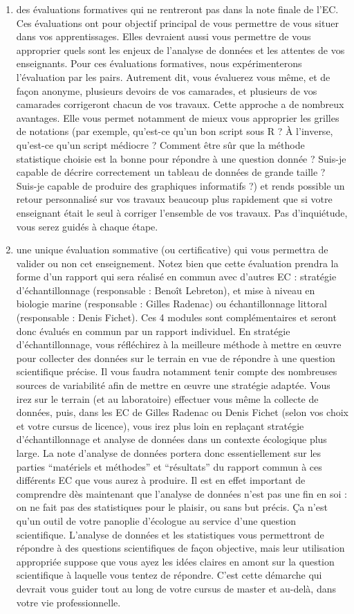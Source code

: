 \documentclass[a4paperpaper,]{article}
\begin{document}
\begin{enumerate}
\def\labelenumi{\arabic{enumi}.}
\item
  des évaluations formatives qui ne rentreront pas dans la note finale de l'EC. Ces évaluations ont pour objectif principal de vous permettre de vous situer dans vos apprentissages. Elles devraient aussi vous permettre de vous approprier quels sont les enjeux de l'analyse de données et les attentes de vos enseignants. Pour ces évaluations formatives, nous expérimenterons l'évaluation par les pairs. Autrement dit, vous évaluerez vous même, et de façon anonyme, plusieurs devoirs de vos camarades, et plusieurs de vos camarades corrigeront chacun de vos travaux. Cette approche a de nombreux avantages. Elle vous permet notamment de mieux vous approprier les grilles de notations (par exemple, qu'est-ce qu'un bon script sous R ? À l'inverse, qu'est-ce qu'un script médiocre ? Comment être sûr que la méthode statistique choisie est la bonne pour répondre à une question donnée ? Suis-je capable de décrire correctement un tableau de données de grande taille ? Suis-je capable de produire des graphiques informatifs ?) et rends possible un retour personnalisé sur vos travaux beaucoup plus rapidement que si votre enseignant était le seul à corriger l'ensemble de vos travaux. Pas d'inquiétude, vous serez guidés à chaque étape.
\item
  une unique évaluation sommative (ou certificative) qui vous permettra de valider ou non cet enseignement. Notez bien que cette évaluation prendra la forme d'un rapport qui sera réalisé en commun avec d'autres EC : stratégie d'échantillonnage (responsable : Benoît Lebreton), et mise à niveau en biologie marine (responsable : Gilles Radenac) ou échantillonnage littoral (responsable : Denis Fichet). Ces 4 modules sont complémentaires et seront donc évalués en commun par un rapport individuel. En stratégie d'échantillonnage, vous réfléchirez à la meilleure méthode à mettre en œuvre pour collecter des données sur le terrain en vue de répondre à une question scientifique précise. Il vous faudra notamment tenir compte des nombreuses sources de variabilité afin de mettre en œuvre une stratégie adaptée. Vous irez sur le terrain (et au laboratoire) effectuer vous même la collecte de données, puis, dans les EC de Gilles Radenac ou Denis Fichet (selon vos choix et votre cursus de licence), vous irez plus loin en replaçant stratégie d'échantillonnage et analyse de données dans un contexte écologique plus large. La note d'analyse de données portera donc essentiellement sur les parties ``matériels et méthodes'' et ``résultats'' du rapport commun à ces différents EC que vous aurez à produire. Il est en effet important de comprendre dès maintenant que l'analyse de données n'est pas une fin en soi : on ne fait pas des statistiques pour le plaisir, ou sans but précis. Ça n'est qu'un outil de votre panoplie d'écologue au service d'une question scientifique. L'analyse de données et les statistiques vous permettront de répondre à des questions scientifiques de façon objective, mais leur utilisation appropriée suppose que vous ayez les idées claires en amont sur la question scientifique à laquelle vous tentez de répondre. C'est cette démarche qui devrait vous guider tout au long de votre cursus de master et au-delà, dans votre vie professionnelle.

\end{enumerate}
\end{document}
